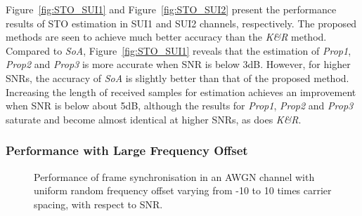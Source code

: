 Figure~\ref{fig:STO_SUI1} and  Figure~\ref{fig:STO_SUI2} present the performance results of STO estimation in SUI1 and SUI2 channels, respectively.
The proposed methods are seen to achieve much better accuracy than the \textit{K\&R} method.
Compared to \textit{SoA}, Figure~\ref{fig:STO_SUI1} reveals that the estimation of \textit{Prop1}, \textit{Prop2} and \textit{Prop3} is more accurate when SNR is below 3{\thinspace}dB.
However, for higher SNRs, the accuracy of \textit{SoA} is slightly better than that of the proposed method.
Increasing the length of received samples for estimation achieves an improvement when SNR is below about 5{\thinspace}dB, although the results for \textit{Prop1}, \textit{Prop2} and \textit{Prop3} saturate and become almost identical at higher SNRs, as does \textit{K\&R}.

		\subsubsection{Performance with Large Frequency Offset}

\begin{figure}[h]
\centering
\caption{Performance of frame synchronisation in an AWGN channel with uniform random frequency offset varying from -10 to 10 times carrier spacing, with respect to SNR.}
\label{fig:STO_AWGN_Fre}
\end{figure}

